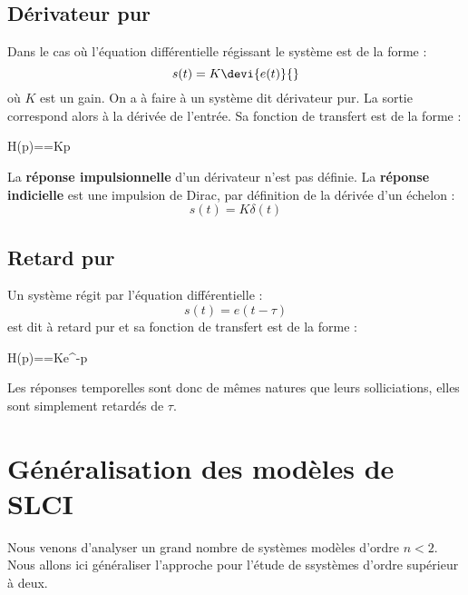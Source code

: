 \subsection{Dérivateur pur}
Dans le cas où l'équation différentielle régissant le système est de la forme :
$$
s(t)=K\devi{e(t)}{}
$$
où $K$ est un gain. On a à faire à un système dit dérivateur pur. 
La sortie correspond alors à la dérivée de l'entrée.
Sa fonction de transfert est de la forme :
\begin{bequation}
H(p)==Kp
\end{bequation}

La \textbf{réponse impulsionnelle} d'un dérivateur n'est pas définie. 
La \textbf{réponse indicielle} est une impulsion de Dirac, par 
définition de la dérivée d'un échelon :
$$
s(t)=K\delta(t)
$$

\subsection{Retard pur}
Un système régit par l'équation différentielle :
$$
s(t)=e(t-\tau)
$$
est dit à retard pur et sa fonction de transfert est de la forme :
\begin{bequation}
H(p)==Ke^{-\tau p}
\end{bequation}
Les réponses temporelles sont donc de mêmes natures que 
leurs solliciations, elles sont simplement retardés de $\tau$.
\newpage
\section{Généralisation des modèles de SLCI}
Nous venons d'analyser un grand nombre de systèmes modèles d'ordre $n<2$. 
Nous allons ici généraliser l'approche pour l'étude de ssystèmes d'ordre 
supérieur à deux.
